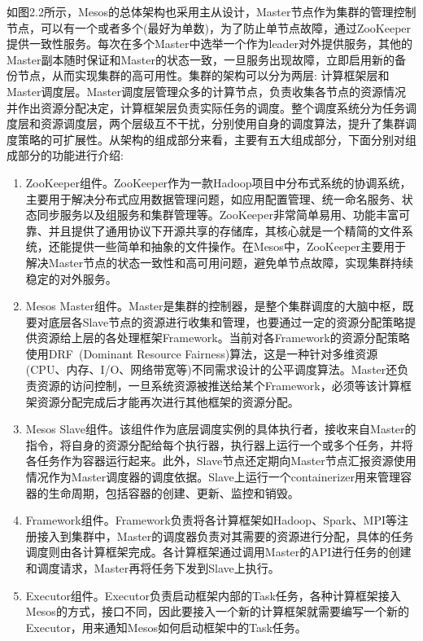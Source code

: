 如图2.2所示，Mesos的总体架构也采用主从设计，Master节点作为集群的管理控制节点，可以有一个或者多个(最好为单数)，为了防止单节点故障，通过ZooKeeper提供一致性服务。每次在多个Master中选举一个作为leader对外提供服务，其他的Master副本随时保证和Master的状态一致，一旦服务出现故障，立即启用新的备份节点，从而实现集群的高可用性。集群的架构可以分为两层: 计算框架层和Master调度层。Master调度层管理众多的计算节点，负责收集各节点的资源情况并作出资源分配决定，计算框架层负责实际任务的调度。整个调度系统分为任务调度层和资源调度层，两个层级互不干扰，分别使用自身的调度算法，提升了集群调度策略的可扩展性。从架构的组成部分来看，主要有五大组成部分，下面分别对组成部分的功能进行介绍:
\begin{enumerate}[1.]
	\item ZooKeeper组件。ZooKeeper作为一款Hadoop项目中分布式系统的协调系统，主要用于解决分布式应用数据管理问题，如应用配置管理、统一命名服务、状态同步服务以及组服务和集群管理等。ZooKeeper非常简单易用、功能丰富可靠、并且提供了通用协议下开源共享的存储库，其核心就是一个精简的文件系统，还能提供一些简单和抽象的文件操作。在Mesos中，ZooKeeper主要用于解决Master节点的状态一致性和高可用问题，避免单节点故障，实现集群持续稳定的对外服务。
	\item Mesos Master组件。Master是集群的控制器，是整个集群调度的大脑中枢，既要对底层各Slave节点的资源进行收集和管理，也要通过一定的资源分配策略提供资源给上层的各处理框架Framework。当前对各Framework的资源分配策略使用DRF~\cite{DRF2011}(Dominant Resource Fairness)算法，这是一种针对多维资源(CPU、内存、I/O、网络带宽等)不同需求设计的公平调度算法。Master还负责资源的访问控制，一旦系统资源被推送给某个Framework，必须等该计算框架资源分配完成后才能再次进行其他框架的资源分配。
	\item Mesos Slave组件。该组件作为底层调度实例的具体执行者，接收来自Master的指令，将自身的资源分配给每个执行器，执行器上运行一个或多个任务，并将各任务作为容器运行起来。此外，Slave节点还定期向Master节点汇报资源使用情况作为Master调度器的调度依据。Slave上运行一个containerizer用来管理容器的生命周期，包括容器的创建、更新、监控和销毁。
	\item Framework组件。Framework负责将各计算框架如Hadoop、Spark、MPI等注册接入到集群中，Master的调度器负责对其需要的资源进行分配，具体的任务调度则由各计算框架完成。各计算框架通过调用Master的API进行任务的创建和调度请求，Master再将任务下发到Slave上执行。
	\item Executor组件。Executor负责启动框架内部的Task任务，各种计算框架接入Mesos的方式，接口不同，因此要接入一个新的计算框架就需要编写一个新的Executor，用来通知Mesos如何启动框架中的Task任务。
\end{enumerate}

